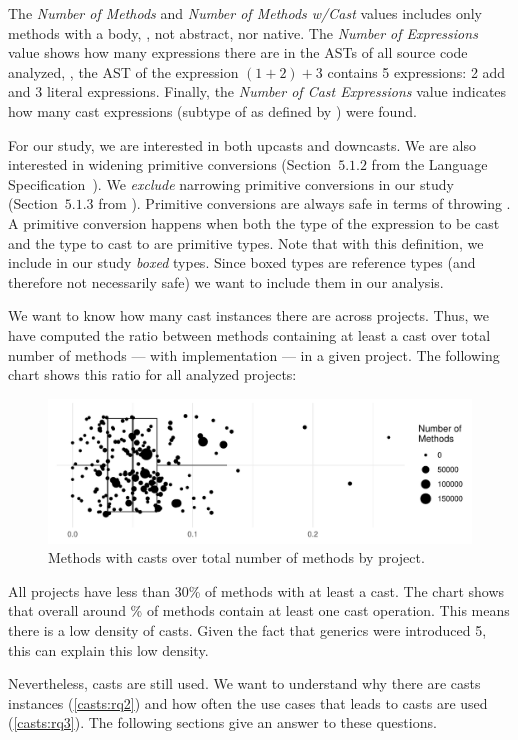 The \emph{Number of Methods} and \emph{Number of Methods w/Cast} values includes only methods with a body, \ie{}, not abstract, nor native.
The \emph{Number of Expressions} value shows how many expressions there are in the ASTs of all source code analyzed, \eg,
the AST of the expression $(1+2)+3$ contains 5 expressions: 2 add and 3 literal expressions.
Finally, the \emph{Number of Cast Expressions} value indicates how many cast expressions (subtype of  as defined by \ql{}) were found.

For our study, we are interested in both upcasts and downcasts.
We are also interested in widening primitive conversions
(Section~$5.1.2$ from the \java{} Language Specification~\citep{Gosling:2013:JLS:2462622}).
We \emph{exclude} narrowing primitive conversions in our study
(Section~$5.1.3$ from \cite{Gosling:2013:JLS:2462622}).
Primitive conversions are always safe in terms of throwing .
A primitive conversion happens when both the type of the expression to be cast and the type to cast to are primitive types.
Note that with this definition, we include in our study \emph{boxed} types.
Since boxed types are reference types (and therefore not necessarily safe)
we want to include them in our analysis.

We want to know how many cast instances there are across projects.
Thus, we have computed the ratio between methods containing
at least a cast over total number of methods --- with implementation --- in a given project.
The following chart shows this ratio for all analyzed projects:

\begin{figure}[ht!]
\includegraphics[width=0.9\columnwidth]{stats/stats-methodwcastXproject.pdf}
\caption{Methods with casts over total number of methods by project.}
\end{figure}

All projects have less than 30\% of methods with at least a cast.
The chart shows that overall around \castpercentage{}\% of methods contain at least one cast operation. 
This means there is a low density of casts.
Given the fact that generics were introduced \java{} 5, this can explain this low density.

Nevertheless, casts are still used.
We want to understand why there are casts instances (\ref{casts:rq2}) and how often the use cases that leads to casts are used (\ref{casts:rq3}).
The following sections give an answer to these questions.
